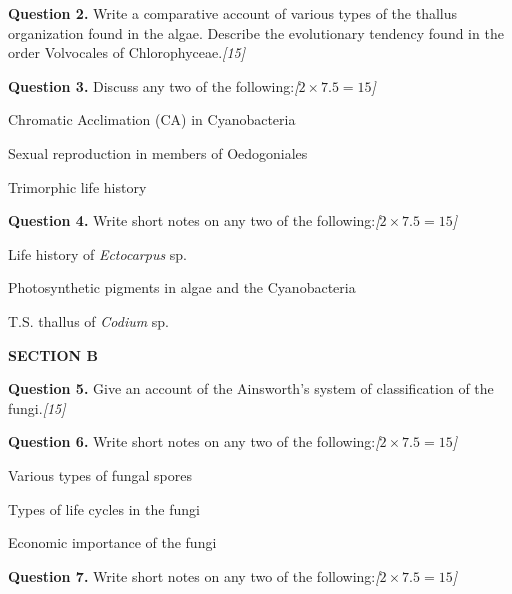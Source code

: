 \documentclass[11pt,a4paper]{article}
\newcommand{\pts}[1]{\hfill   \textit{[#1]}}
\begin{document}
\medskip


\noindent   \textbf{Question 2.} Write a comparative account of various types of the thallus organization found in the algae. Describe the evolutionary tendency found in the order Volvocales of Chlorophyceae.\pts{15}

\medskip


\noindent   \textbf{Question 3.} Discuss any two of the following:\pts{$2  \times 7.5 = 15$}

\begin{parts}
  \item Chromatic Acclimation (CA) in Cyanobacteria
  \item Sexual reproduction in members of Oedogoniales
  \item Trimorphic life history
\end{parts}

\medskip


\noindent   \textbf{Question 4.} Write short notes on any two of the following:\pts{$2  \times 7.5 = 15$}

\begin{parts}
  \item Life history of   \textit{Ectocarpus} sp.
  \item Photosynthetic pigments in algae and the Cyanobacteria
  \item T.S. thallus of   \textit{Codium} sp.
\end{parts}

\bigskip

\begin{center}
   \textbf{SECTION B}
\end{center}
\medskip

\medskip


\noindent   \textbf{Question 5.} Give an account of the Ainsworth's system of classification of the fungi.\pts{15}

\medskip


\noindent   \textbf{Question 6.} Write short notes on any two of the following:\pts{$2  \times 7.5 = 15$}

\begin{parts}
  \item Various types of fungal spores
  \item Types of life cycles in the fungi
  \item Economic importance of the fungi
\end{parts}

\medskip


\noindent   \textbf{Question 7.} Write short notes on any two of the following:\pts{$2  \times 7.5 = 15$}
\end{document}
